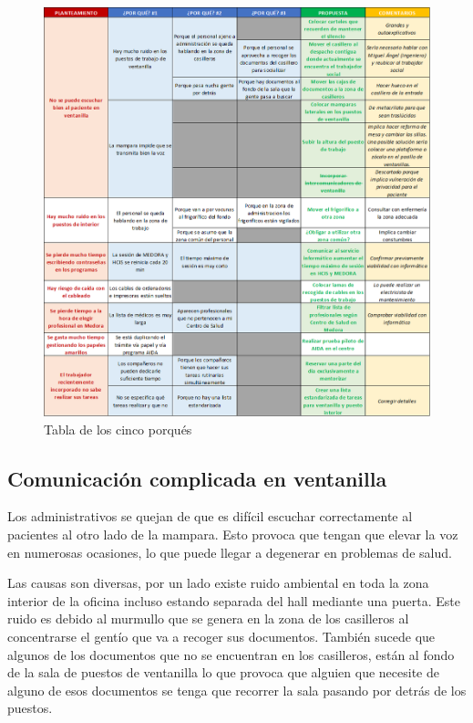 \begin{figure}
    \includegraphics[width=\textwidth]{img/cinco-porques.png}
    \caption{Tabla de los cinco porqués}
    \label{fig:cinco-porques}
\end{figure}

\subsection{Comunicación complicada en ventanilla}

Los administrativos se quejan de que es difícil escuchar correctamente al pacientes al otro lado de la mampara.
Esto provoca que tengan que elevar la voz en numerosas ocasiones, lo que puede llegar a degenerar en problemas de salud.

Las causas son diversas, por un lado existe ruido ambiental en toda la zona interior de la oficina incluso estando separada del hall mediante una puerta.
Este ruido es debido al murmullo que se genera en la zona de los casilleros al concentrarse el gentío que va a recoger sus documentos.
También sucede que algunos de los documentos que no se encuentran en los casilleros, están al fondo de la sala de puestos de ventanilla lo que provoca que alguien que necesite de alguno de esos documentos se tenga que recorrer la sala pasando por detrás de los puestos.

